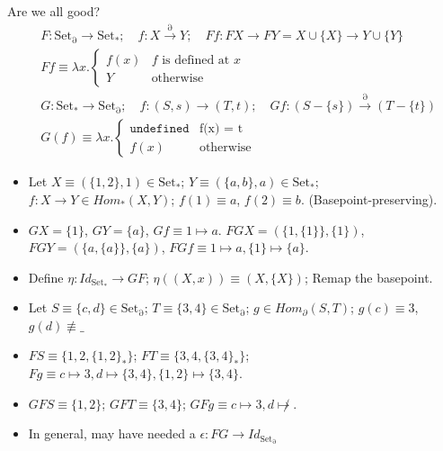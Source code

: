 \documentclass[8pt]{beamer}
\newcommand{\partialset}{\ensuremath{\operatorname{Set_\partial}}}
\newcommand{\pointedset}{\ensuremath{\operatorname{Set_*}}}
\begin{document}
\begin{frame}{Are we all good?}
\begin{align*}
    &F: \partialset \rightarrow \pointedset; \quad f: X \xrightarrow{\partial} Y; \quad Ff : FX \rightarrow FY = X \cup \{ X \} \rightarrow Y \cup \{ Y \} \\
    &Ff \equiv \lambda x.
    \begin{cases}
        f(x) & \text{$f$ is defined at $x$} \\
        Y & \text{otherwise} 
    \end{cases} \\
    &G: \pointedset \rightarrow \partialset; \quad f: (S, s) \rightarrow (T, t); \quad Gf: (S -\{s\}) \xrightarrow{\partial} (T - \{ t \}) \\
&G(f) \equiv \lambda x.
\begin{cases}
    \texttt{undefined} & \text{f(x) = t} \\
    f(x) & \text{otherwise}
\end{cases}
\end{align*}
\pause

\begin{itemize}
    \item Let $X \equiv (\{1, 2\}, 1) \in \pointedset$; $Y \equiv (\{a, b\}, a) \in \pointedset$; $f: X \rightarrow Y \in Hom_*(X, Y)$; $f(1) \equiv a$, $f(2) \equiv b$. \pause (Basepoint-preserving). \pause
     \item $GX = \{1\}$, $GY = \{a\}$, $Gf \equiv 1 \mapsto a$. \pause $FGX = (\{1, \{1\}\}, \{1\})$, $FGY = (\{a, \{a\}\}, \{a \})$, $FGf \equiv 1 \mapsto a, \{1  \} \mapsto \{ a \}$. \pause
     \item Define $\eta: Id_{\pointedset} \rightarrow GF$; $\eta((X, x)) \equiv (X, \{X\})$; \pause Remap the basepoint.
     \item Let $S \equiv \{c, d\} \in \partialset$; $T \equiv \{3, 4\} \in \partialset$;  $g \in Hom_\partial(S, T)$; $g(c) \equiv 3$, $g(d) \not \equiv \_$
     \item $FS \equiv \{1, 2, \{1, 2\}_* \}$; $FT \equiv \{3, 4, \{3, 4\}_* \}$; $Fg \equiv c \mapsto 3, d \mapsto \{3, 4\}, \{1, 2\} \mapsto \{3, 4\}$.
     \item $GFS \equiv \{1, 2 \}$; $GFT \equiv \{3, 4 \}$; $GFg \equiv c \mapsto 3, d \not \mapsto$. \pause
    \item In general, may have needed a $\epsilon: FG \rightarrow Id_{\partialset}$
\end{itemize}
\end{frame}
\end{document}
